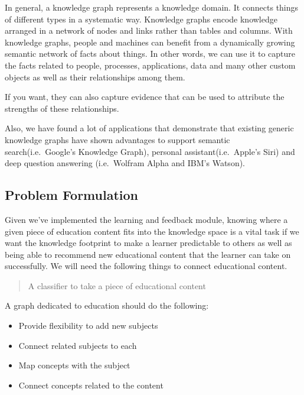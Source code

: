 \documentclass[]{book}
\theoremstyle{definition}
\theoremstyle{definition}
\theoremstyle{definition}
\theoremstyle{remark}
\begin{document}
In general, a knowledge graph represents a knowledge domain. It connects
things of different types in a systematic way. Knowledge graphs encode
knowledge arranged in a network of nodes and links rather than tables
and columns. With knowledge graphs, people and machines can benefit from
a dynamically growing semantic network of facts about things. In other
words, we can use it to capture the facts related to people, processes,
applications, data and many other custom objects as well as their
relationships among them.

If you want, they can also capture evidence that can be used to
attribute the strengths of these relationships.

Also, we have found a lot of applications that demonstrate that existing
generic knowledge graphs have shown advantages to support semantic
search(i.e.~Google's Knowledge Graph), personal assistant(i.e.~Apple's
Siri) and deep question answering (i.e.~Wolfram Alpha and IBM's Watson).

\subsection{Problem Formulation}\label{problem-formulation-2}

Given we've implemented the learning and feedback module, knowing where
a given piece of education content fits into the knowledge space is a
vital task if we want the knowledge footprint to make a learner
predictable to others as well as being able to recommend new educational
content that the learner can take on successfully. We will need the
following things to connect educational content.

\begin{quote}
A classifier to take a piece of educational content
\end{quote}

A graph dedicated to education should do the following:

\begin{itemize}
\item
  Provide flexibility to add new subjects
\item
  Connect related subjects to each
\item
  Map concepts with the subject
\item
  Connect concepts related to the content
\end{itemize}
\end{document}
